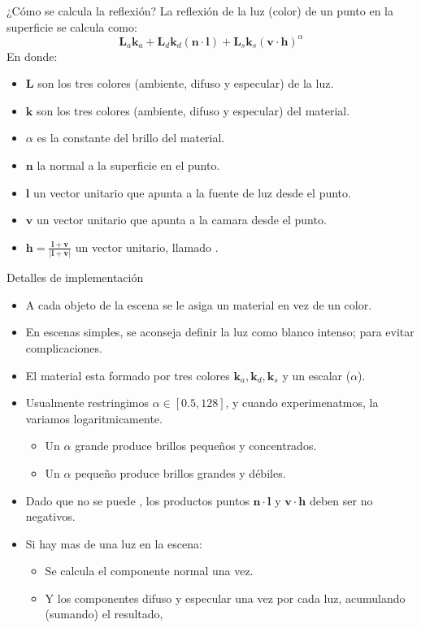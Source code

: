 \begin{frame}{¿Cómo se calcula la reflexión?}
La reflexión de la luz (color) de un punto en la superficie se calcula como:
 $$\mathbf{L}_a \mathbf{k}_a + \mathbf{L}_d \mathbf{k}_d (\mathbf{n} \cdot \mathbf{l}) + \mathbf{L}_s \mathbf{k}_s (\mathbf{v} \cdot \mathbf{h})^{\alpha}$$
 En donde:
 \begin{itemize}
  \item $\mathbf{L}$ son los tres colores (ambiente, difuso y especular) de la luz.
  \item $\mathbf{k}$ son los tres colores (ambiente, difuso y especular) del material.
  \item $\alpha$ es la constante del brillo del material.
  \item $\mathbf{n}$ la normal a la superficie en el punto.
  \item $\mathbf{l}$ un vector unitario que apunta a la fuente de luz desde el punto.
  \item $\mathbf{v}$ un vector unitario que apunta a la camara desde el punto.
  \item $\mathbf{h} = \frac{\mathbf{l} + \mathbf{v}}{|\mathbf{l} + \mathbf{v}|}$ un vector unitario, llamado .
 \end{itemize}
\end{frame}


\begin{frame}{Detalles de implementación}
\begin{itemize}
  \item A cada objeto de la escena se le asiga un material en vez de un color.
  \item En escenas simples, se aconseja definir la luz como blanco intenso; para evitar complicaciones.
   \item El material esta formado por tres colores $\mathbf{k}_a, \mathbf{k}_d, \mathbf{k}_s$ y un escalar ($\alpha$).
   \item Usualmente restringimos $\alpha \in [ 0.5, 128 ]$, y cuando experimenatmos, la variamos logaritmicamente.
  \begin{itemize}
   \item Un $\alpha$ grande produce brillos pequeños y concentrados.
   \item Un $\alpha$ pequeño produce brillos grandes y débiles.
  \end{itemize}
  \item Dado que no se puede , los productos puntos $\mathbf{n} \cdot \mathbf{l}$ y $\mathbf{v} \cdot \mathbf{h}$ deben ser no negativos.
  \item Si hay mas de una luz en la escena:
  \begin{itemize}
   \item Se calcula el componente normal una vez.
   \item Y los componentes difuso y especular una vez por cada luz, acumulando (sumando) el resultado,
  \end{itemize}
\end{itemize}
\end{frame}

